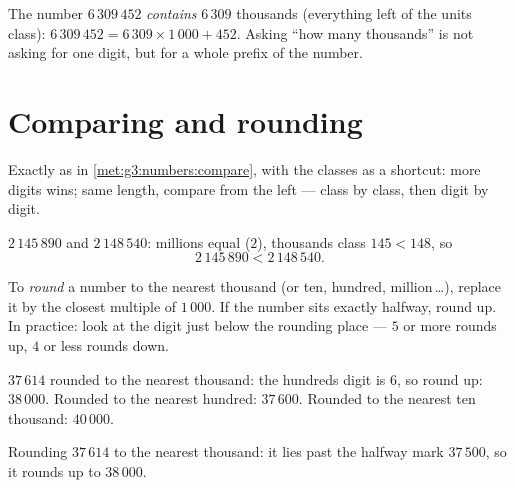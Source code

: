 \begin{example}\label{ex:g4:numbers:contained}
The number $6\,309\,452$ \emph{contains} $6\,309$ thousands
(everything left of the units class): $6\,309\,452 = 6\,309 \times
1\,000 + 452$. Asking ``how many thousands'' is not asking for one
digit, but for a whole prefix of the number.
\end{example}

\section{Comparing and rounding}

\begin{method}\label{met:g4:numbers:compare}
Exactly as in \cref{met:g3:numbers:compare}, with the classes as a
shortcut: more digits wins; same length, compare from the left ---
class by class, then digit by digit.
\end{method}

\begin{example}\label{ex:g4:numbers:compare}
$2\,145\,890$ and $2\,148\,540$: millions equal ($2$), thousands
class $145 < 148$, so
\[
2\,145\,890 < 2\,148\,540 .
\]
\end{example}

\begin{definition}[Rounding]\label{def:g4:numbers:round}
To \emph{round} a number to the nearest thousand
(or ten, hundred, million\,\dots), replace it by the closest multiple
of $1\,000$. If the number sits exactly halfway, round up. In
practice: look at the digit just below the rounding place --- $5$ or
more rounds up, $4$ or less rounds down.
\end{definition}

\begin{example}\label{ex:g4:numbers:round}
$37\,614$ rounded to the nearest thousand: the hundreds digit is
$6$, so round up: $38\,000$. Rounded to the nearest hundred:
$37\,600$. Rounded to the nearest ten thousand: $40\,000$.
\end{example}

\begin{omfigure}

{\small Rounding $37\,614$ to the nearest thousand: it lies past the
halfway mark $37\,500$, so it rounds up to $38\,000$.}
\end{omfigure}

